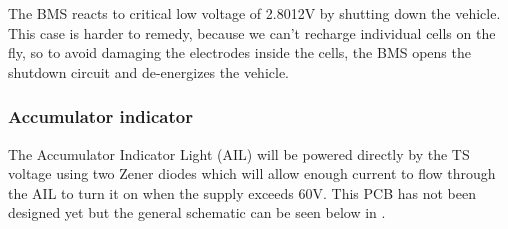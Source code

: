\documentclass{article}
\begin{document}
The BMS reacts to critical low voltage of 2.8012V by shutting down the vehicle. This case is harder to remedy, because we can't recharge individual cells on the fly, so to avoid damaging the electrodes inside the cells, the BMS opens the shutdown circuit and de-energizes the vehicle. 

\subsubsection{Accumulator indicator}\label{accumulator_indicator}
The Accumulator Indicator Light (AIL) will be powered directly by the TS voltage using two Zener diodes which will allow enough current to flow through the AIL to turn it on when the supply exceeds 60V. This PCB has not been designed yet but the general schematic can be seen below in . \\
\end{document}
